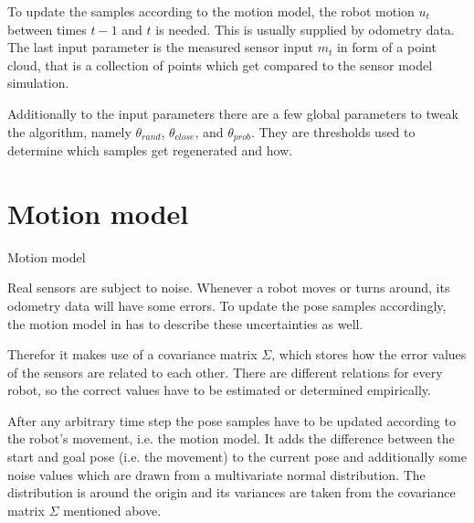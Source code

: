 \documentclass[Thesis.tex]{subfiles}
\begin{document}
To update the samples according to the motion model, the robot motion $u_{t}$ between times $t-1$ and $t$ is needed. This is usually supplied by odometry data. The last input parameter is the measured sensor input $m_{t}$ in form of a point cloud, that is a collection of points which get compared to the sensor model simulation.

Additionally to the input parameters there are a few global parameters to tweak the algorithm, namely $\theta_{rand}$, $\theta_{close}$, and $\theta_{prob}$. They are thresholds used to determine which samples get regenerated and how.
%
%
%
%
%
%
\section{Motion model}\label{sec:motion_model_section}
%
\begin{algorithm}[!htp]
\caption{Motion model}
\label{alg:motionmodel}

\end{algorithm}
%
Real sensors are subject to noise. Whenever a robot moves or turns around, its odometry data will have some errors.
To update the pose samples accordingly, the motion model in  has to describe these uncertainties as well.

Therefor it makes use of a covariance matrix $\Sigma$, which stores how the error values of the sensors are related to each other. There are different relations for every robot, so the correct values have to be estimated or determined empirically.

After any arbitrary time step the pose samples have to be updated according to the robot's movement, i.e. the motion model. It adds the difference between the start and goal pose (i.e. the movement) to the current pose and additionally some noise values which are drawn from a multivariate normal distribution. The distribution is around the origin and its variances are taken from the covariance matrix $\Sigma$ mentioned above. 
\end{document}
